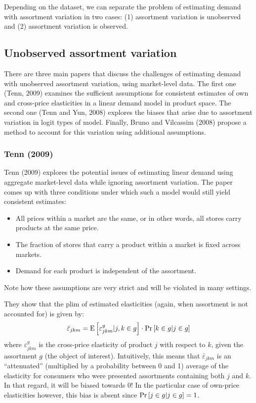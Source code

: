 Depending on the dataset, we can separate the problem of estimating demand with assortment variation in two cases: (1) assortment variation is unobserved and (2) assortment variation is observed.

\subsection{Unobserved assortment variation}

There are three main papers that discuss the challenges of estimating demand with unobserved assortment variation, using market-level data. The first one (Tenn, 2009) examines the sufficient assumptions for consistent estimates of own and cross-price elasticities in a linear demand model in product space. The second one (Tenn and Yun, 2008) explores the biases that arise due to assortment variation in logit types of model. Finally, Bruno and Vilcassim (2008) propose a method to account for this variation using additional assumptions.

\subsubsection{Tenn (2009)}

Tenn (2009) explores the potential issues of estimating linear demand using aggregate market-level data while ignoring assortment variation. The paper comes up with three conditions under which such a model would still yield consistent estimates:\begin{itemize}
\item All prices within a market are the same, or in other words, all stores carry products at the same price.
\item The fraction of stores that carry a product within a market is fixed across markets.
\item Demand for each product is independent of the assortment.
\end{itemize}
Note how these assumptions are very strict and will be violated in many settings.

They show that the plim of estimated elasticities (again, when assortment is not accounted for) is given by: $$\bar \varepsilon_{jkm} = \operatorname{E}\left[\varepsilon_{jkm}^g|j, k\in g\right] \cdot \operatorname{Pr}\left[k\in g|j\in g\right] $$ where $\varepsilon_{jkm}^g$ is the cross-price elasticity of product $j$ with respect to $k$, given the assortment $g$ (the object of interest). Intuitively, this means that $\bar \varepsilon_{jkm}$ is an ``attenuated'' (multiplied by a probability between 0 and 1) average of the elasticity for consumers who were presented assortments containing both $j$ and $k$. In that regard, it will be biased towards 0! In the particular case of own-price elasticities however, this bias is absent since $\operatorname{Pr}\left[j\in g|j\in g\right] = 1$.

